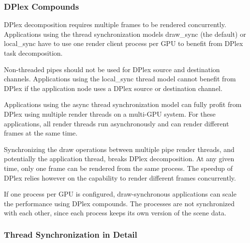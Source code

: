 \documentclass[10pt,a4]{scrartcl}
\begin{document}
\subsubsection{\label{sAdvDPlex}DPlex Compounds}

DPlex decomposition requires multiple frames to be rendered
concurrently. Applications using the thread synchronization models
\textsf{draw\_sync} (the default) or \textsf{local\_sync} have to use
one render client process per GPU to benefit from DPlex task
decomposition.

Non-threaded pipes should not be used for DPlex source and destination
channels. Applications using the \textsf{local\_sync} thread model cannot
benefit from DPlex if the application node uses a DPlex source or destination
channel.

Applications using the \textsf{async} thread synchronization model can
fully profit from DPlex using multiple render threads on a multi-GPU
system. For these applications, all render threads run asynchronously
and can render different frames at the same time.

Synchronizing the draw operations between multiple pipe render threads,
and potentially the application thread, breaks DPlex decomposition. At
any given time, only one frame can be rendered from the same
process. The speedup of DPlex relies however on the capability to
render different frames concurrently.

If one process per GPU is configured, draw-synchronous applications can
scale the performance using DPlex compounds. The processes are not
synchronized with each other, since each process keeps its own version
of the scene data.


\subsubsection{Thread Synchronization in Detail}
\end{document}
